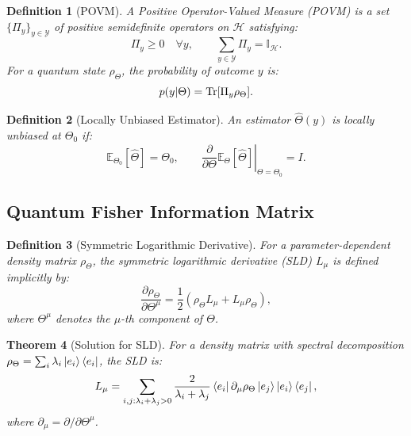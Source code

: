 \documentclass[12pt]{article}
\newtheorem{theorem}{Theorem}[section]
\newtheorem{definition}[theorem]{Definition}
\newcommand{\E}{\mathbb{E}}
\newcommand{\Hil}{\mathcal{H}}
\newcommand{\I}{\mathbb{I}}
\begin{document}
\begin{definition}[POVM]
A Positive Operator-Valued Measure (POVM) is a set \(\{\Pi_y\}_{y\in\mathcal{Y}}\) of positive semidefinite operators on \(\Hil\) satisfying:
\begin{equation}
    \Pi_y \geq 0 \quad \forall y, \qquad \sum_{y\in\mathcal{Y}} \Pi_y = \I_{\Hil}.
\end{equation}
For a quantum state \(\rho_\Theta\), the probability of outcome \(y\) is:
\begin{equation}
    p(y|\Theta) = \Tr[\Pi_y \rho_\Theta].
\end{equation}
\end{definition}

\begin{definition}[Locally Unbiased Estimator]
An estimator \(\hat{\Theta}(y)\) is locally unbiased at \(\Theta_0\) if:
\begin{equation}
    \E_{\Theta_0}[\hat{\Theta}] = \Theta_0, \qquad \left.\frac{\partial}{\partial\Theta} \E_{\Theta}[\hat{\Theta}]\right|_{\Theta=\Theta_0} = I.
\end{equation}
\end{definition}

\subsection{Quantum Fisher Information Matrix}

\begin{definition}[Symmetric Logarithmic Derivative]
For a parameter-dependent density matrix \(\rho_\Theta\), the symmetric logarithmic derivative (SLD) \(L_\mu\) is defined implicitly by:
\begin{equation}
    \frac{\partial \rho_\Theta}{\partial \Theta^\mu} = \frac{1}{2}\left(\rho_\Theta L_\mu + L_\mu \rho_\Theta\right),
\end{equation}
where \(\Theta^\mu\) denotes the \(\mu\)-th component of \(\Theta\).
\end{definition}

\begin{theorem}[Solution for SLD]
For a density matrix with spectral decomposition \(\rho_\Theta = \sum_i \lambda_i \ket{e_i}\bra{e_i}\), the SLD is:
\begin{equation}
    L_\mu = \sum_{i,j: \lambda_i + \lambda_j > 0} \frac{2}{\lambda_i + \lambda_j} \bra{e_i} \partial_\mu \rho_\Theta \ket{e_j} \ket{e_i}\bra{e_j},
\end{equation}
where \(\partial_\mu = \partial/\partial\Theta^\mu\).
\end{theorem}
\end{document}

